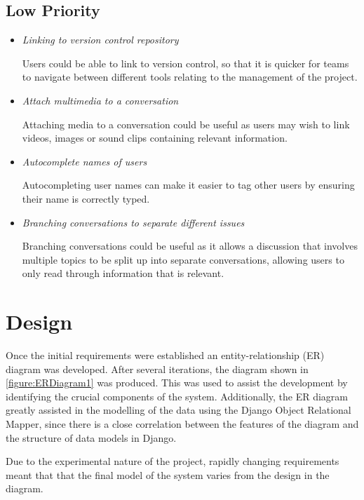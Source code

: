 \documentclass[a4paper]{l3proj}
\begin{document}
\subsection{Low Priority}
\begin{itemize}
\item \textit{Linking to version control repository} \par
Users could be able to link to version control, so that it is quicker for teams to navigate between different tools relating to the management of the project.

\item \textit{Attach multimedia to a conversation} \par
Attaching media to a conversation could be useful as users may wish to link videos, images or sound clips containing relevant information.

\item \textit{Autocomplete names of users} \par
Autocompleting user names can make it easier to tag other users by ensuring their name is correctly typed.

\item \textit{Branching conversations to separate different issues} \par
Branching conversations could be useful as it allows a discussion that involves multiple topics to be split up into separate conversations, allowing users to only read through information that is relevant.

\end{itemize}

\fi


\section{Design}
\label{design}

Once the initial requirements were established an entity-relationship (ER) diagram was developed. After several iterations, the diagram shown in \autoref{figure:ERDiagram1} was produced. This was used to assist the development by identifying the crucial components of the system. Additionally, the ER diagram greatly assisted in the modelling of the data using the Django Object Relational Mapper, since there is a close correlation between the features of the diagram and the structure of data models in Django.

Due to the experimental nature of the project, rapidly changing requirements meant that that the final model of the system varies from the design in the diagram.
\end{document}
